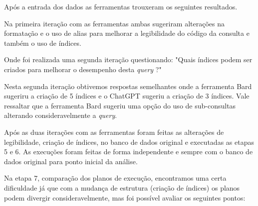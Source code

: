 \documentclass[12pt]{article}
\begin{document}
Após a entrada dos dados as ferramentas trouxeram os seguintes resultados.

Na primeira iteração com as ferramentas ambas sugeriram alterações na formatação e o uso de alias para melhorar a legibilidade do código da consulta e também o uso de índices.

Onde foi realizada uma segunda iteração questionando: "Quais índices podem ser criados para melhorar o desempenho desta \emph{query} ?"

Nesta segunda iteração obtivemos respostas semelhantes onde a ferramenta Bard sugeriru a criação de 5 índices e o ChatGPT sugeriu a criação de 3 índices. Vale ressaltar que a ferramenta Bard sugeriu uma opção do uso de sub-consultas alterando consideravelmente a \emph{query}.

Após as duas iterações com as ferramentas foram feitas as alterações de legibilidade, criação de índices, no banco de dados original e executadas as etapas 5 e 6. As execuções foram feitas de forma independente e sempre com o banco de dados original para ponto inicial da análise.

Na etapa 7, comparação dos planos de execução, encontramos uma certa dificuldade já que com a mudança de estrutura (criação de índices) os planos podem divergir consideravelmente, mas foi possível avaliar os seguintes pontos:
\end{document}
